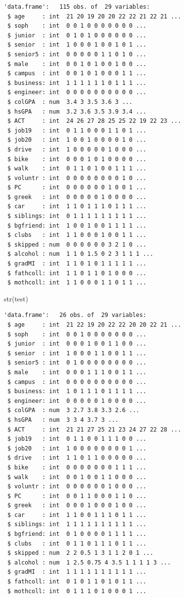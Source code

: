 \documentclass[
  letterpaper,
  DIV=11,
  numbers=noendperiod]{scrartcl}
\newenvironment{Shaded}{\begin{snugshade}}{\end{snugshade}}
\newcommand{\FunctionTok}[1]{\textcolor[rgb]{0.28,0.35,0.67}{#1}}
\newcommand{\NormalTok}[1]{\textcolor[rgb]{0.00,0.23,0.31}{#1}}
\begin{document}
\begin{verbatim}
'data.frame':   115 obs. of  29 variables:
 $ age     : int  21 20 19 20 20 22 22 21 22 21 ...
 $ soph    : int  0 0 1 0 0 0 0 0 0 0 ...
 $ junior  : int  0 1 0 1 0 0 0 0 0 0 ...
 $ senior  : int  1 0 0 0 1 0 0 1 0 1 ...
 $ senior5 : int  0 0 0 0 0 1 1 0 1 0 ...
 $ male    : int  0 0 1 0 1 0 0 1 0 0 ...
 $ campus  : int  0 0 1 0 1 0 0 0 1 1 ...
 $ business: int  1 1 1 1 1 1 0 1 1 1 ...
 $ engineer: int  0 0 0 0 0 0 0 0 0 0 ...
 $ colGPA  : num  3.4 3 3.5 3.6 3 ...
 $ hsGPA   : num  3.2 3.6 3.5 3.9 3.4 ...
 $ ACT     : int  24 26 27 28 25 25 22 19 22 23 ...
 $ job19   : int  0 1 1 0 0 0 1 1 0 1 ...
 $ job20   : int  1 0 0 1 0 0 0 0 1 0 ...
 $ drive   : int  1 0 0 0 0 0 1 0 0 0 ...
 $ bike    : int  0 0 0 1 0 1 0 0 0 0 ...
 $ walk    : int  0 1 1 0 1 0 0 1 1 1 ...
 $ voluntr : int  0 0 0 0 0 0 0 0 1 0 ...
 $ PC      : int  0 0 0 0 0 0 1 0 0 1 ...
 $ greek   : int  0 0 0 0 0 1 0 0 0 0 ...
 $ car     : int  1 1 0 1 1 1 0 1 1 1 ...
 $ siblings: int  0 1 1 1 1 1 1 1 1 1 ...
 $ bgfriend: int  1 0 0 1 0 0 1 1 1 1 ...
 $ clubs   : int  1 1 0 0 0 1 0 0 1 1 ...
 $ skipped : num  0 0 0 0 0 0 3 2 1 0 ...
 $ alcohol : num  1 1 0 1.5 0 2 3 1 1 1 ...
 $ gradMI  : int  1 1 0 1 0 1 1 1 1 1 ...
 $ fathcoll: int  1 1 0 1 1 0 1 0 0 0 ...
 $ mothcoll: int  1 1 0 0 0 1 1 0 1 1 ...
\end{verbatim}

\begin{Shaded}
\begin{Highlighting}[]
\FunctionTok{str}\NormalTok{(test)}
\end{Highlighting}
\end{Shaded}

\begin{verbatim}
'data.frame':   26 obs. of  29 variables:
 $ age     : int  21 22 19 20 22 22 20 20 22 21 ...
 $ soph    : int  0 0 1 0 0 0 0 0 0 0 ...
 $ junior  : int  0 0 0 1 0 0 1 1 0 0 ...
 $ senior  : int  1 0 0 0 1 1 0 0 1 1 ...
 $ senior5 : int  0 1 0 0 0 0 0 0 0 0 ...
 $ male    : int  0 0 0 1 1 1 0 0 1 1 ...
 $ campus  : int  0 0 0 0 0 0 0 0 0 0 ...
 $ business: int  1 0 1 1 1 0 1 1 1 1 ...
 $ engineer: int  0 0 0 0 0 1 0 0 0 0 ...
 $ colGPA  : num  3 2.7 3.8 3.3 2.6 ...
 $ hsGPA   : num  3 3 4 3.7 3 ...
 $ ACT     : int  21 21 27 25 21 23 24 27 22 28 ...
 $ job19   : int  0 1 1 0 0 1 1 1 0 0 ...
 $ job20   : int  1 0 0 0 0 0 0 0 0 1 ...
 $ drive   : int  1 1 0 1 1 0 0 0 0 0 ...
 $ bike    : int  0 0 0 0 0 0 0 1 1 1 ...
 $ walk    : int  0 0 1 0 0 1 1 0 0 0 ...
 $ voluntr : int  0 0 0 0 0 0 1 0 0 0 ...
 $ PC      : int  0 0 1 1 0 0 0 1 1 0 ...
 $ greek   : int  0 0 0 1 0 0 0 1 0 0 ...
 $ car     : int  1 1 0 0 1 1 1 0 1 1 ...
 $ siblings: int  1 1 1 1 1 1 1 1 1 1 ...
 $ bgfriend: int  0 1 0 0 0 0 1 1 1 1 ...
 $ clubs   : int  0 1 1 0 1 1 1 0 1 1 ...
 $ skipped : num  2 2 0.5 1 3 1 1 2 0 1 ...
 $ alcohol : num  1 2.5 0.75 4 3.5 1 1 1 1 3 ...
 $ gradMI  : int  1 1 1 1 1 1 1 1 1 1 ...
 $ fathcoll: int  0 1 0 1 1 0 1 0 1 1 ...
 $ mothcoll: int  0 1 1 1 0 1 0 0 0 1 ...
\end{verbatim}
\end{document}
